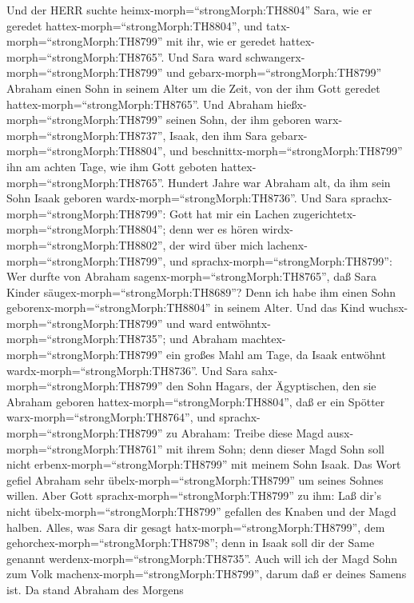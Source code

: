  Und der HERR suchte heimx-morph=``strongMorph:TH8804''
Sara, wie er geredet hattex-morph=``strongMorph:TH8804'', und
tatx-morph=``strongMorph:TH8799'' mit ihr, wie er geredet
hattex-morph=``strongMorph:TH8765''.  Und Sara ward
schwangerx-morph=``strongMorph:TH8799'' und
gebarx-morph=``strongMorph:TH8799'' Abraham einen Sohn in seinem Alter
um die Zeit, von der ihm Gott geredet
hattex-morph=``strongMorph:TH8765''.  Und Abraham
hießx-morph=``strongMorph:TH8799'' seinen Sohn, der ihm geboren
warx-morph=``strongMorph:TH8737'', Isaak, den ihm Sara
gebarx-morph=``strongMorph:TH8804'',  und
beschnittx-morph=``strongMorph:TH8799'' ihn am achten Tage, wie ihm Gott
geboten hattex-morph=``strongMorph:TH8765''.  Hundert Jahre
war Abraham alt, da ihm sein Sohn Isaak geboren
wardx-morph=``strongMorph:TH8736''.  Und Sara
sprachx-morph=``strongMorph:TH8799'': Gott hat mir ein Lachen
zugerichtetx-morph=``strongMorph:TH8804''; denn wer es hören
wirdx-morph=``strongMorph:TH8802'', der wird über mich
lachenx-morph=``strongMorph:TH8799'',  und
sprachx-morph=``strongMorph:TH8799'': Wer durfte von Abraham
sagenx-morph=``strongMorph:TH8765'', daß Sara Kinder
säugex-morph=``strongMorph:TH8689''? Denn ich habe ihm einen Sohn
geborenx-morph=``strongMorph:TH8804'' in seinem Alter.  Und
das Kind wuchsx-morph=``strongMorph:TH8799'' und ward
entwöhntx-morph=``strongMorph:TH8735''; und Abraham
machtex-morph=``strongMorph:TH8799'' ein großes Mahl am Tage, da Isaak
entwöhnt wardx-morph=``strongMorph:TH8736''.  Und Sara
sahx-morph=``strongMorph:TH8799'' den Sohn Hagars, der Ägyptischen, den
sie Abraham geboren hattex-morph=``strongMorph:TH8804'', daß er ein
Spötter warx-morph=``strongMorph:TH8764'',  und
sprachx-morph=``strongMorph:TH8799'' zu Abraham: Treibe diese Magd
ausx-morph=``strongMorph:TH8761'' mit ihrem Sohn; denn dieser Magd Sohn
soll nicht erbenx-morph=``strongMorph:TH8799'' mit meinem Sohn Isaak.
 Das Wort gefiel Abraham sehr
übelx-morph=``strongMorph:TH8799'' um seines Sohnes willen.
 Aber Gott sprachx-morph=``strongMorph:TH8799'' zu ihm: Laß
dir's nicht übelx-morph=``strongMorph:TH8799'' gefallen des Knaben und
der Magd halben. Alles, was Sara dir gesagt
hatx-morph=``strongMorph:TH8799'', dem
gehorchex-morph=``strongMorph:TH8798''; denn in Isaak soll dir der Same
genannt werdenx-morph=``strongMorph:TH8735''.  Auch will
ich der Magd Sohn zum Volk machenx-morph=``strongMorph:TH8799'', darum
daß er deines Samens ist.  Da stand Abraham des Morgens
